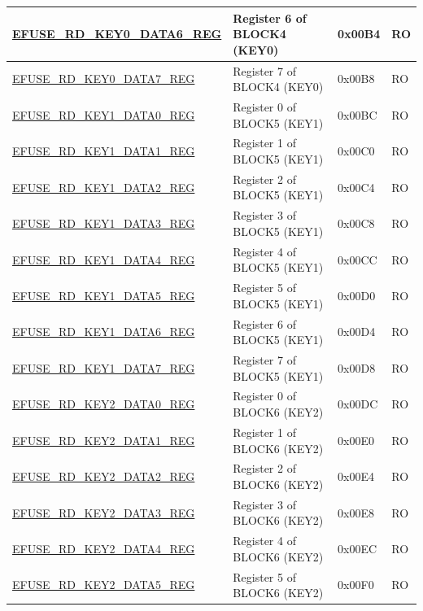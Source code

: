 \begin{longtable}{ | p{6cm} | p{7.2cm} | p{1.3cm} | p{1cm} | }
\hyperref[regdesc:EFUSERDKEY0DATA6REG]{EFUSE\_RD\_KEY0\_DATA6\_REG} & Register 6 of BLOCK4 (KEY0) & 0x00B4 & RO \\ \hline
\hyperref[regdesc:EFUSERDKEY0DATA7REG]{EFUSE\_RD\_KEY0\_DATA7\_REG} & Register 7 of BLOCK4 (KEY0) & 0x00B8 & RO \\ \hline
\hyperref[regdesc:EFUSERDKEY1DATA0REG]{EFUSE\_RD\_KEY1\_DATA0\_REG} & Register 0 of BLOCK5 (KEY1) & 0x00BC & RO \\ \hline
\hyperref[regdesc:EFUSERDKEY1DATA1REG]{EFUSE\_RD\_KEY1\_DATA1\_REG} & Register 1 of BLOCK5 (KEY1) & 0x00C0 & RO \\ \hline
\hyperref[regdesc:EFUSERDKEY1DATA2REG]{EFUSE\_RD\_KEY1\_DATA2\_REG} & Register 2 of BLOCK5 (KEY1) & 0x00C4 & RO \\ \hline
\hyperref[regdesc:EFUSERDKEY1DATA3REG]{EFUSE\_RD\_KEY1\_DATA3\_REG} & Register 3 of BLOCK5 (KEY1) & 0x00C8 & RO \\ \hline
\hyperref[regdesc:EFUSERDKEY1DATA4REG]{EFUSE\_RD\_KEY1\_DATA4\_REG} & Register 4 of BLOCK5 (KEY1) & 0x00CC & RO \\ \hline
\hyperref[regdesc:EFUSERDKEY1DATA5REG]{EFUSE\_RD\_KEY1\_DATA5\_REG} & Register 5 of BLOCK5 (KEY1) & 0x00D0 & RO \\ \hline
\hyperref[regdesc:EFUSERDKEY1DATA6REG]{EFUSE\_RD\_KEY1\_DATA6\_REG} & Register 6 of BLOCK5 (KEY1)  & 0x00D4 & RO \\ \hline
\hyperref[regdesc:EFUSERDKEY1DATA7REG]{EFUSE\_RD\_KEY1\_DATA7\_REG} & Register 7 of BLOCK5 (KEY1)  & 0x00D8 & RO \\ \hline
\hyperref[regdesc:EFUSERDKEY2DATA0REG]{EFUSE\_RD\_KEY2\_DATA0\_REG} & Register 0 of BLOCK6 (KEY2)  & 0x00DC & RO \\ \hline
\hyperref[regdesc:EFUSERDKEY2DATA1REG]{EFUSE\_RD\_KEY2\_DATA1\_REG} & Register 1 of BLOCK6 (KEY2)  & 0x00E0 & RO \\ \hline
\hyperref[regdesc:EFUSERDKEY2DATA2REG]{EFUSE\_RD\_KEY2\_DATA2\_REG} & Register 2 of BLOCK6 (KEY2)  & 0x00E4 & RO \\ \hline
\hyperref[regdesc:EFUSERDKEY2DATA3REG]{EFUSE\_RD\_KEY2\_DATA3\_REG} & Register 3 of BLOCK6 (KEY2)  & 0x00E8 & RO \\ \hline
\hyperref[regdesc:EFUSERDKEY2DATA4REG]{EFUSE\_RD\_KEY2\_DATA4\_REG} & Register 4 of BLOCK6 (KEY2)  & 0x00EC & RO \\ \hline
\hyperref[regdesc:EFUSERDKEY2DATA5REG]{EFUSE\_RD\_KEY2\_DATA5\_REG} & Register 5 of BLOCK6 (KEY2)  & 0x00F0 & RO \\ \hline

\end{longtable}
